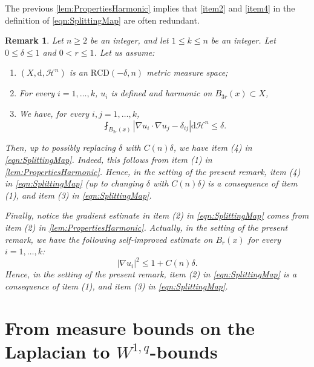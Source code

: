 \documentclass[12pt,a4paper,reqno]{amsart}
\newtheorem{remark}[theorem]{Remark}
\renewcommand{\leq}{\leqslant}
\renewcommand{\geq}{\geqslant}
\renewcommand{\d}{\ensuremath{\mathrm d}}
\begin{document}
The previous \cref{lem:PropertiesHarmonic} implies that \cref{item2} and \cref{item4} in the definition of \cref{eqn:SplittingMap} are often redundant.

\begin{remark}\label{rem:HessianNotNecessary}
    Let $n\geq 2$ be an integer, and let $1\leq k\leq n$ be an integer. Let $0\leq \delta\leq 1$ and $0<r\leq 1$. Let us assume:
    \begin{enumerate}
        \item $(X,\mathrm{d},\mathcal{H}^n)$ is an $\mathrm{RCD}(-\delta,n)$ metric measure space;
        \item For every $i=1,\ldots, k$, $u_i$ is defined and harmonic on $B_{3r}(x)\subset X$,
        \item We have, for every $i,j=1,\ldots,k$,
        \[
        \fint_{B_{2r}(x)} |\nabla u_i\cdot \nabla u_j-\delta_{ij}|\d\mathcal{H}^n \leq \delta.
        \]
    \end{enumerate}
    Then, up to possibly replacing $\delta$ with $C(n)\delta$, we have item (4) in \cref{eqn:SplittingMap}. Indeed, this follows from item (1) in \cref{lem:PropertiesHarmonic}. Hence, in the setting of the present remark, item (4) in \cref{eqn:SplittingMap} (up to changing $\delta$ with $C(n)\delta$) is a consequence of item (1), and item (3) in \cref{eqn:SplittingMap}. 
    
    Finally, notice the gradient estimate in item (2) in \cref{eqn:SplittingMap} comes from item (2) in \cref{lem:PropertiesHarmonic}. Actually, in the setting of the present remark, we have the following self-improved estimate on $B_r(x)$ for every $i=1,\ldots,k$:
    \[
    |\nabla u_i|^2\leq 1+C(n)\delta.
    \]
    Hence, in the setting of the present remark, item (2) in \cref{eqn:SplittingMap} is a consequence of item (1), and item (3) in \cref{eqn:SplittingMap}. 
\end{remark}

\section{From measure bounds on the Laplacian to \texorpdfstring{$W^{1,q}$}{W1q}-bounds}
\end{document}
